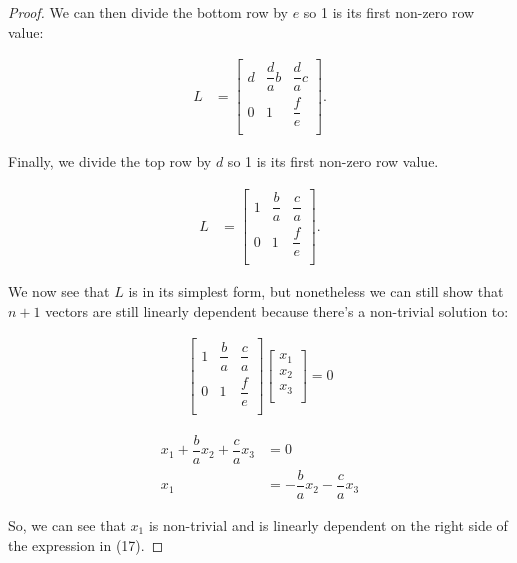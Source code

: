 \documentclass[12pt]{article}
\begin{document}
\begin{proof}
\noindent
We can then divide the bottom row by $e$ so 1 is its first non-zero row value:

\begin{equation}
\begin{split}
L & =
\begin{bmatrix}
    d & \dfrac{d}{a}b & \dfrac{d}{a}c \\
    0 & 1 & \dfrac{f}{e} \\
\end{bmatrix}.
\end{split}
\end{equation}

\noindent
Finally, we divide the top row by $d$ so 1 is its first non-zero row value.

\begin{equation}
\begin{split}
L & =
\begin{bmatrix}
    1 & \dfrac{b}{a} & \dfrac{c}{a} \\
    0 & 1 & \dfrac{f}{e} \\
\end{bmatrix}.
\end{split}
\end{equation}

\noindent
We now see that $L$ is in its simplest form, but nonetheless we can still show that $n+1$ vectors are still linearly dependent because there's a non-trivial solution to:

\begin{equation}
\begin{split}
\begin{bmatrix}
    1 & \dfrac{b}{a} & \dfrac{c}{a} \\
    0 & 1 & \dfrac{f}{e} \\
\end{bmatrix}
\begin{bmatrix}
    x_1 \\
    x_2 \\
    x_3 \\
\end{bmatrix}
= 0
\end{split}
\end{equation}

\begin{equation}
\begin{split}
x_1 + \dfrac{b}{a}x_2 + \dfrac{c}{a}x_3 &= 0 \\
x_1 &= - \dfrac{b}{a}x_2 - \dfrac{c}{a}x_3
\end{split}
\end{equation}

\noindent
So, we can see that $x_1$ is non-trivial and is linearly dependent on the right side of the expression in (17).

\end{proof}
\end{document}
